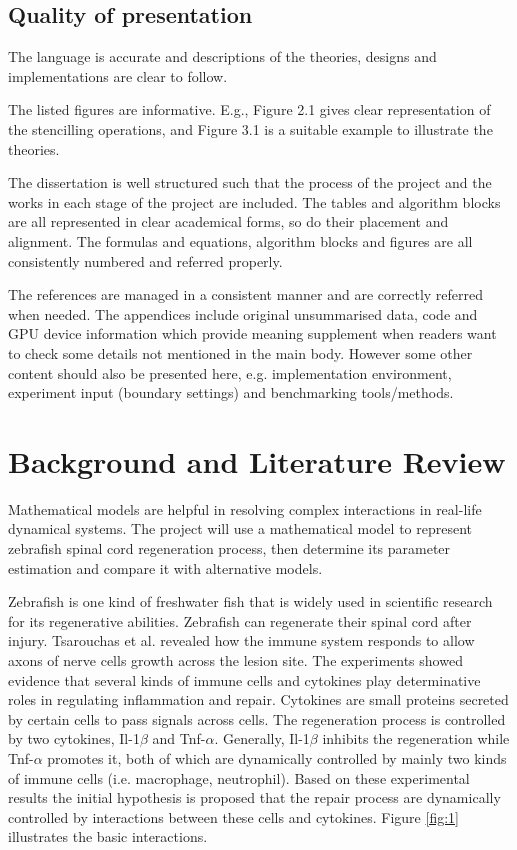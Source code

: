 \documentclass{article}
\begin{document}
\subsection*{Quality of presentation}
The language is accurate and descriptions of the theories, designs and implementations are clear to follow.

The listed figures are informative. E.g., Figure 2.1 gives clear representation of the stencilling operations, and Figure 3.1 is a suitable example to illustrate the theories.

The dissertation is well structured such that the process of the project and the works in each stage of the project are included. The tables and algorithm blocks are all represented in clear academical forms, so do their placement and alignment. The formulas and equations, algorithm blocks and figures are all consistently numbered and referred properly.

The references are managed in a consistent manner and are correctly referred when needed. The appendices include original unsummarised data, code and GPU device information which provide meaning supplement when readers want to check some details not mentioned in the main body. However some other content should also be presented here, e.g. implementation environment, experiment input (boundary settings) and benchmarking tools/methods.

\section{Background and Literature Review}

Mathematical models are helpful in resolving complex interactions in real-life 
dynamical systems. The project will use a mathematical model to represent 
zebrafish spinal cord regeneration process, then determine its parameter 
estimation and compare it with alternative models.

Zebrafish is one kind of freshwater fish that is widely used in scientific 
research for its regenerative abilities. Zebrafish can regenerate their spinal 
cord after injury. Tsarouchas et al.\cite{ref:Tsarouchas} revealed how the immune system 
responds to 
allow axons of nerve cells growth across the lesion site. The experiments showed 
evidence that several kinds of immune cells and cytokines play determinative 
roles in regulating inflammation and repair. Cytokines are small proteins 
secreted by certain cells to pass signals across cells. The regeneration 
process is controlled by two cytokines, Il-1$\beta$ and Tnf-$\alpha$. Generally, 
Il-1$\beta$ 
inhibits the regeneration while Tnf-$\alpha$ promotes it, both of which are 
dynamically controlled by mainly two kinds of immune cells (i.e. macrophage, 
neutrophil). Based on these experimental results the initial 
hypothesis is proposed that the repair process are dynamically controlled by 
interactions between these cells and cytokines. Figure \ref{fig:1} illustrates the 
basic interactions.
\end{document}
